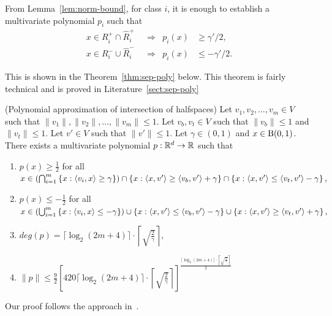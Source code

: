 From Lemma~\ref{lem:norm-bound}, for class $i$, it is enough to
establish a multivariate polynomial $p_i$ such that
\begin{align*}
x\in R^{+}_i \cap \hat{R}^{+}_i & \ \ \ \Rightarrow & p_i(x) & \geq \gamma'/2, \\
x\in R^{-}_i \cup \hat{R}^{-}_i & \ \ \ \Rightarrow & p_i(x) & \leq -\gamma'/2.
\end{align*}


This is shown in the Theorem~\ref{thm:sep-poly} below.  This theorem
is fairly technical and is proved in Literature~\ref{sect:sep-poly}

\begin{theorem}
(Polynomial approximation of intersection of halfspaces)
Let $v_1,v_2,\ldots,v_m \in V$ such that $\|v_1\|,\|v_2\|,\ldots,\|v_m\| \leq 1$.
Let $v_b,v_t\in V$ such that $\|v_b\|\leq 1$ and $\|v_t\|\leq 1$.
Let $v' \in V$ such that $\|v'\|\leq 1$.
Let $\gamma \in (0,1)$ and $x \in {\mathrm{B}}(0,1)$.
There exists a multivariate polynomial $p:{\mathbb{R}}^d\to {\mathbb{R}}$ such that
\begin{enumerate}
\item $p(x) \geq \frac{1}{2}$ for all $x \in \left(\bigcap_{i=1}^m \left\{x: \langle v_i,x\rangle\geq \gamma\right\}\right) \cap \left\{x:\langle x,v'\rangle \geq \langle v_b,v'\rangle+\gamma\right\} \cap \left\{x: \langle x,v'\rangle \leq \langle v_t,v'\rangle-\gamma\right\},$
\item $p(x) \leq -\frac{1}{2}$ for all $x \in \left(\bigcup_{i=1}^m \left\{x: \langle v_i,x\rangle\leq -\gamma\right\}\right) \cup \left\{x: \langle x,v'\rangle \leq \langle v_b,v'\rangle-\gamma\right\} \cup \left\{x: \langle x,v'\rangle \geq \langle v_t,v'\rangle+\gamma\right\},$
\item $deg(p)=\lceil\log_2(2m+4)\rceil\cdot\left\lceil\sqrt{\frac{2}{\gamma}}\right\rceil,$
\item $\|p\|\leq \frac{9}{2}\left[420\lceil\log_2(2m+4)\rceil\cdot\left\lceil\sqrt{\frac{2}{\gamma}}\right\rceil\right]^{\frac{\lceil\log_2(2m+4)\rceil\cdot\left\lceil\sqrt{\frac{2}{\gamma}}\right\rceil}{2}}$
\end{enumerate}

\label{thm:sep-poly}
\end{theorem}

Our proof follows the approach in~\cite{BeygelzimerPSTWZ2019-separable}.

